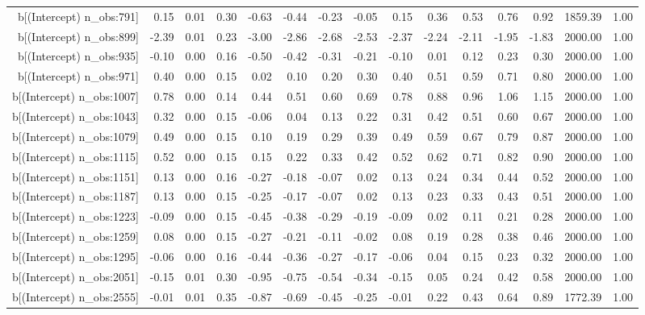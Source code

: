 \begin{table}[ht]
\begin{tabular}{rrrrrrrrrrrrrrr}
  b[(Intercept) n\_obs:791] & 0.15 & 0.01 & 0.30 & -0.63 & -0.44 & -0.23 & -0.05 & 0.15 & 0.36 & 0.53 & 0.76 & 0.92 & 1859.39 & 1.00 \\ 
  b[(Intercept) n\_obs:899] & -2.39 & 0.01 & 0.23 & -3.00 & -2.86 & -2.68 & -2.53 & -2.37 & -2.24 & -2.11 & -1.95 & -1.83 & 2000.00 & 1.00 \\ 
  b[(Intercept) n\_obs:935] & -0.10 & 0.00 & 0.16 & -0.50 & -0.42 & -0.31 & -0.21 & -0.10 & 0.01 & 0.12 & 0.23 & 0.30 & 2000.00 & 1.00 \\ 
  b[(Intercept) n\_obs:971] & 0.40 & 0.00 & 0.15 & 0.02 & 0.10 & 0.20 & 0.30 & 0.40 & 0.51 & 0.59 & 0.71 & 0.80 & 2000.00 & 1.00 \\ 
  b[(Intercept) n\_obs:1007] & 0.78 & 0.00 & 0.14 & 0.44 & 0.51 & 0.60 & 0.69 & 0.78 & 0.88 & 0.96 & 1.06 & 1.15 & 2000.00 & 1.00 \\ 
  b[(Intercept) n\_obs:1043] & 0.32 & 0.00 & 0.15 & -0.06 & 0.04 & 0.13 & 0.22 & 0.31 & 0.42 & 0.51 & 0.60 & 0.67 & 2000.00 & 1.00 \\ 
  b[(Intercept) n\_obs:1079] & 0.49 & 0.00 & 0.15 & 0.10 & 0.19 & 0.29 & 0.39 & 0.49 & 0.59 & 0.67 & 0.79 & 0.87 & 2000.00 & 1.00 \\ 
  b[(Intercept) n\_obs:1115] & 0.52 & 0.00 & 0.15 & 0.15 & 0.22 & 0.33 & 0.42 & 0.52 & 0.62 & 0.71 & 0.82 & 0.90 & 2000.00 & 1.00 \\ 
  b[(Intercept) n\_obs:1151] & 0.13 & 0.00 & 0.16 & -0.27 & -0.18 & -0.07 & 0.02 & 0.13 & 0.24 & 0.34 & 0.44 & 0.52 & 2000.00 & 1.00 \\ 
  b[(Intercept) n\_obs:1187] & 0.13 & 0.00 & 0.15 & -0.25 & -0.17 & -0.07 & 0.02 & 0.13 & 0.23 & 0.33 & 0.43 & 0.51 & 2000.00 & 1.00 \\ 
  b[(Intercept) n\_obs:1223] & -0.09 & 0.00 & 0.15 & -0.45 & -0.38 & -0.29 & -0.19 & -0.09 & 0.02 & 0.11 & 0.21 & 0.28 & 2000.00 & 1.00 \\ 
  b[(Intercept) n\_obs:1259] & 0.08 & 0.00 & 0.15 & -0.27 & -0.21 & -0.11 & -0.02 & 0.08 & 0.19 & 0.28 & 0.38 & 0.46 & 2000.00 & 1.00 \\ 
  b[(Intercept) n\_obs:1295] & -0.06 & 0.00 & 0.16 & -0.44 & -0.36 & -0.27 & -0.17 & -0.06 & 0.04 & 0.15 & 0.23 & 0.32 & 2000.00 & 1.00 \\ 
  b[(Intercept) n\_obs:2051] & -0.15 & 0.01 & 0.30 & -0.95 & -0.75 & -0.54 & -0.34 & -0.15 & 0.05 & 0.24 & 0.42 & 0.58 & 2000.00 & 1.00 \\ 
  b[(Intercept) n\_obs:2555] & -0.01 & 0.01 & 0.35 & -0.87 & -0.69 & -0.45 & -0.25 & -0.01 & 0.22 & 0.43 & 0.64 & 0.89 & 1772.39 & 1.00 \\ 

\end{tabular}
\end{table}

